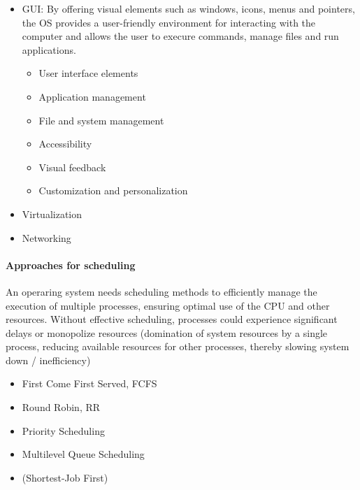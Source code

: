 \documentclass[a4paper,12pt]{article}
\begin{document}
\begin{itemize}
    \begin{itemize}
        \item Resource usage tracking
        \item Process accounting
        \item User accounting
        \item Performance monitoring
        \item Auditing and reporting
        \item Billing and chargeback
        \end{itemize}
    \item GUI: By offering visual elements such as windows, icons, menus and pointers, the OS provides a user-friendly environment for interacting with the computer and allows the user to execure commands, manage files and run applications. 
    \begin{itemize}
        \item User interface elements
        \item Application management
        \item File and system management
        \item Accessibility
        \item Visual feedback
        \item Customization and personalization
        \end{itemize}
    \item Virtualization
    \item Networking
\end{itemize}
\paragraph{Approaches for scheduling}
An operaring system needs scheduling methods to efficiently manage the execution of multiple processes, ensuring optimal use of the CPU and other resources. Without effective scheduling, processes could experience significant delays or monopolize resources (domination of system resources by a single process, reducing available resources for other processes, thereby slowing system down / inefficiency)
\begin{itemize}
    \item First Come First Served, FCFS
    \item Round Robin, RR
    \item Priority Scheduling
    \item Multilevel Queue Scheduling
    \item (Shortest-Job First)
\end{itemize}
\end{document}
